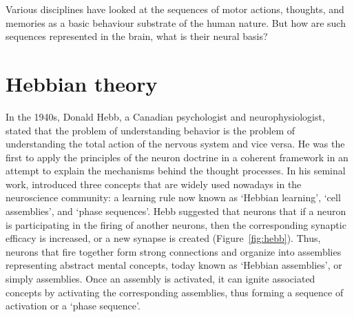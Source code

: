   Various disciplines have looked at the sequences of motor actions, thoughts,
  and memories as a basic behaviour substrate of the human nature. But how are
  such sequences represented in the brain, what is their neural basis?



\section{Hebbian theory}
\label{sec:hebb}
  In the 1940s, Donald Hebb, a Canadian psychologist and neurophysiologist,
  stated that the problem of understanding behavior is the problem of
  understanding the total action of the nervous system and vice versa. He was
  the first to apply the principles of the neuron doctrine \citep{Cajal1894} in
  a coherent framework in an attempt to explain the mechanisms behind the
  thought processes. In his seminal work, \cite{Hebb49} introduced three
  concepts that are widely used nowadays in the neuroscience community: a
  learning rule now known as `Hebbian learning', `cell assemblies', and `phase
  sequences'. Hebb suggested that neurons that if a neuron is participating in
  the firing of another neurons, then the corresponding synaptic efficacy is
  increased, or a new synapse is created (Figure~\ref{fig:hebb}). Thus, neurons that fire together form
  strong connections and organize into assemblies representing abstract mental
  concepts, today known as `Hebbian assemblies', or simply assemblies. Once an
  assembly is activated, it can ignite associated concepts by activating the
  corresponding assemblies, thus forming a sequence of activation or a `phase
  sequence'.
   
